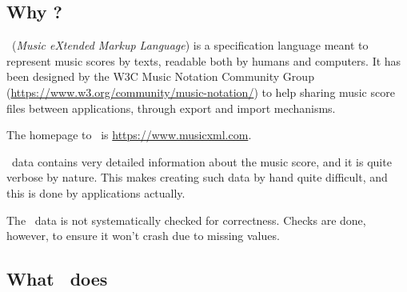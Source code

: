 \subsection{Why \xmlToLy?}

\mxml\ ({\it Music eXtended Markup Language}) is a specification language meant to represent music scores by texts, readable both by humans and computers. It has been designed by the W3C Music Notation Community Group (\url{https://www.w3.org/community/music-notation/}) to help sharing music score files between applications, through export and import mechanisms.

The homepage to \mxml\ is \url{https://www.musicxml.com}.

\mxml\ data contains very detailed information about the music score, and it is quite verbose by nature. This makes creating such data by hand quite difficult, and this is done by applications actually.

The \mxml\ data is not systematically checked for correctness. Checks are done, however, to ensure it won't crash due to missing values.


\subsection{What \xmlToLy\ does}

